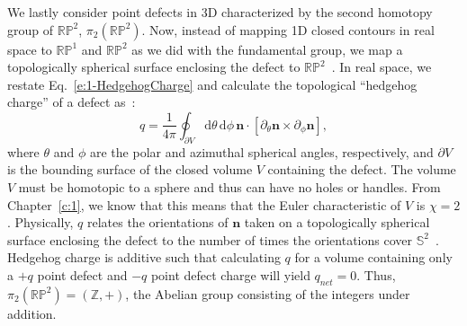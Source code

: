 We lastly consider point defects in 3D characterized by the second homotopy group of $\mathbb{R}\mathbb{P}^2$, $\pi_{2}(\mathbb{R}\mathbb{P}^2)$.
Now, instead of mapping 1D closed contours in real space to $\mathbb{R}\mathbb{P}^1$ and $\mathbb{R}\mathbb{P}^2$ as we did with the fundamental group, we map a topologically spherical surface enclosing the defect to $\mathbb{R}\mathbb{P}^2$~\cite{RN196,RN153,RN236}.
In real space, we restate Eq.~\ref{e:1-HedgehogCharge} and calculate the topological ``hedgehog charge'' of a defect as~\cite{RN153}:
\begin{equation}
  q = \frac{1}{4 \pi} \oint_{\partial V} \textrm{d} \theta \, \textrm{d} \phi \, \mathbf{n} \cdot \left [ \partial_{\theta} \mathbf{n} \times \partial_{\phi} \mathbf{n} \right ],\label{e:2-hedCharge}
\end{equation}
 where $\theta$ and $\phi$ are the polar and azimuthal spherical angles, respectively, and $\partial V$ is the bounding surface of the closed volume $V$ containing the defect.
The volume $V$ must be homotopic to a sphere and thus can have no holes or handles.
From Chapter~\ref{c:1}, we know that this means that the Euler characteristic of $V$ is $\chi = 2$.
Physically, $q$ relates the orientations of $\mathbf{n}$ taken on a topologically spherical surface enclosing the defect to the number of times the orientations cover $\mathbb{S}^2$~\cite{RN153}.
Hedgehog charge is additive such that calculating $q$ for a volume containing only a $+q$ point defect and $-q$ point defect charge will yield $q_{net} = 0$.
Thus, $\pi_{2}(\mathbb{R}\mathbb{P}^2) = (\mathbb{Z}, +)$, the Abelian group consisting of the integers under addition.

